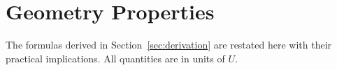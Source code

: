 \section{Geometry Properties}
\label{sec:geometry}

The formulas derived in Section~\ref{sec:derivation} are restated here with their practical implications. All quantities are in units of $U$.
